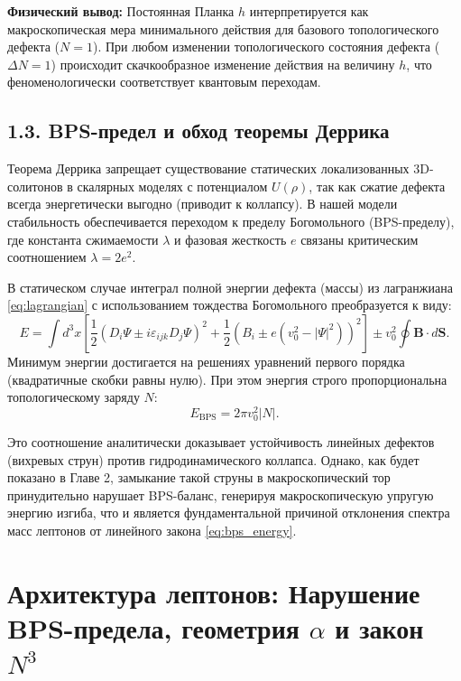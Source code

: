 \documentclass[11pt,a4paper]{article}
\begin{document}
	\textbf{Физический вывод:} Постоянная Планка $h$ интерпретируется как макроскопическая мера минимального действия для базового топологического дефекта ($N=1$). При любом изменении топологического состояния дефекта ($\Delta N = 1$) происходит скачкообразное изменение действия на величину $h$, что феноменологически соответствует квантовым переходам.
	
	\subsection{1.3. BPS-предел и обход теоремы Деррика}
	Теорема Деррика запрещает существование статических локализованных 3D-солитонов в скалярных моделях с потенциалом $U(\rho)$, так как сжатие дефекта всегда энергетически выгодно (приводит к коллапсу). 
	В нашей модели стабильность обеспечивается переходом к пределу Богомольного (BPS-пределу), где константа сжимаемости $\lambda$ и фазовая жесткость $e$ связаны критическим соотношением $\lambda = 2e^2$.
	
	В статическом случае интеграл полной энергии дефекта (массы) из лагранжиана \eqref{eq:lagrangian} с использованием тождества Богомольного преобразуется к виду:
	\begin{equation}
		E = \int d^3x \left[ \frac{1}{2} \left( D_i \Psi \pm i \varepsilon_{ijk} D_j \Psi \right)^2 + \frac{1}{2} \left( B_i \pm e(v_0^2 - |\Psi|^2) \right)^2 \right] \pm v_0^2 \oint \mathbf{B} \cdot d\mathbf{S}.
	\end{equation}
	Минимум энергии достигается на решениях уравнений первого порядка (квадратичные скобки равны нулю). При этом энергия строго пропорциональна топологическому заряду $N$:
	\begin{equation}
		E_{\text{BPS}} = 2\pi v_0^2 |N|.
		\label{eq:bps_energy}
	\end{equation}
	
	Это соотношение аналитически доказывает устойчивость линейных дефектов (вихревых струн) против гидродинамического коллапса. Однако, как будет показано в Главе 2, замыкание такой струны в макроскопический тор принудительно нарушает BPS-баланс, генерируя макроскопическую упругую энергию изгиба, что и является фундаментальной причиной отклонения спектра масс лептонов от линейного закона \eqref{eq:bps_energy}.
	
	\section{Архитектура лептонов: Нарушение BPS-предела, геометрия $\alpha$ и закон $N^3$}
	
\end{document}
